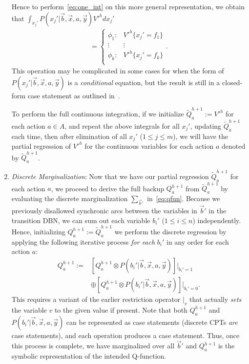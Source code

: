 \documentclass[letterpaper]{article}
\begin{document}
\begin{enumerate}
Hence to perform~\eqref{eq:one_int} on this more general
representation, we obtain that $\int_{x_j'} P(x_j'|\vec{b},\vec{x},a,\vec{y}) V'^{h} dx_j'$
\begin{align*}
    = \begin{cases}
    \phi_1: & V'^{h} \{ x_j' = f_1 \} \\ 
   \vdots&\vdots\\ 
    \phi_k: & V'^{h} \{ x_j' = f_k \}  \\ 
  \end{cases}.
\end{align*}
This operation may be complicated in some cases for
when the form of 
$P(x_j'|\vec{b},\vec{x},a,\vec{y})$ is a \emph{conditional} 
equation, but the result is still in a closed-form case
statement as outlined in~\cite{sanner_uai11}.

To perform the full continuous integration, 
if we initialize 
$\tilde{Q}_a^{h+1} := V'^{h}$ for each action $a \in A$, and repeat
the above integrals for all $x_j'$, updating $\tilde{Q}_a^{h+1}$ each time,
then after elimination of all $x_j'$ ($1 \leq j \leq m$), we will have 
the partial regression of $V'^{h}$ for the continuous variables for
each action $a$ denoted by $\tilde{Q}_a^{h+1}$.

\item {\it Discrete Marginalization}: Now that we have our partial
regression $\tilde{Q}_a^{h+1}$ for each action $a$, we proceed
to derive the full backup $Q_a^{h+1}$ from $\tilde{Q}_a^{h+1}$
by evaluating the discrete 
marginalization $\sum_{\vec{b}'}$ in~\eqref{eq:qfun}.
Because we previously disallowed synchronic arcs
between the variables in $\vec{b}'$ 
in the transition DBN, we can sum out each variable $b_i'$ ($1 \leq i \leq n$) 
independently.  Hence, initializing
$Q_a^{h+1} := \tilde{Q}_a^{h+1}$
we perform the discrete regression by applying the following iterative
process \emph{for each} $b_i'$ in any order
for each action $a$:
\begin{align}
Q_a^{h+1} := & \left[ Q_a^{h+1} \otimes P(b_i'|\vec{b},\vec{x},a,\vec{y}) \right]|_{b_i' = 1} \nonumber \\
 & \oplus \left[ Q_a^{h+1} \otimes P(b_i'|\vec{b},\vec{x},a,\vec{y}) \right]|_{b_i' = 0}.
\end{align}
This requires a variant of the earlier restriction operator $|_v$ that
actually \emph{sets} the variable $v$ to the given value if present.
Note that both $Q_a^{h+1}$ and $P(b_i'|\vec{b},\vec{x},a,\vec{y})$ can be represented
as case statements (discrete CPTs \emph{are} case statements), 
and each operation produces a case statement.
Thus, once this process is complete, we have marginalized over
all $\vec{b}'$ and $Q_a^{h+1}$ is the symbolic representation
of the intended Q-function.


\end{enumerate}
\end{document}

